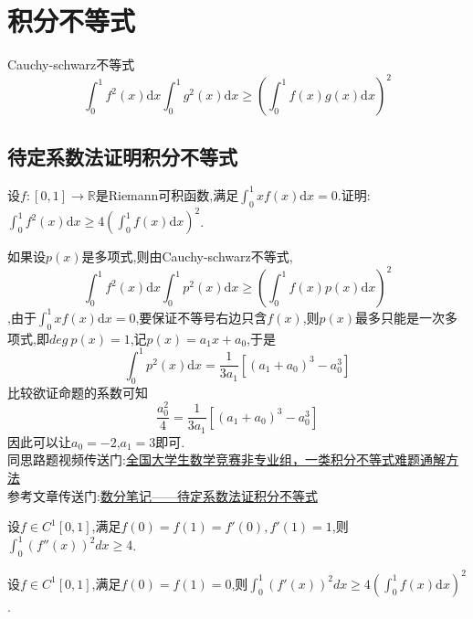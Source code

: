 \chapter{积分不等式}

\begin{theorem}{Cauchy-schwarz不等式}
	$$
		\int_0^1{f^2\left( x \right) \text{d}x}\int_0^1{g^2\left( x \right) \text{d}x}\ge \left( \int_0^1{f\left( x \right) g\left( x \right) \text{d}x} \right) ^2
	$$
\end{theorem}

\section{待定系数法证明积分不等式}

\begin{example}
	设$f:[0,1]\rightarrow \mathbb{R}$是Riemann可积函数,满足$
		\int_0^1{xf\left( x \right) \text{d}x}=0
	$.证明:$
		\int_0^1{f^2\left( x \right) \text{d}x}\ge 4\left( \int_0^1{f\left( x \right) \text{d}x} \right) ^2
	$.
\end{example}

\begin{note}
	如果设$p(x)$是多项式,则由Cauchy-schwarz不等式,
	$$
		\int_0^1{f^2\left( x \right) \text{d}x}\int_0^1{p^2\left( x \right) \text{d}x}\ge \left( \int_0^1{f\left( x \right) p\left( x \right) \text{d}x} \right) ^2
	$$,由于$
		\int_0^1{xf\left( x \right) \text{d}x}=0
	$,要保证不等号右边只含$f(x)$,则$p(x)$最多只能是一次多项式,即$deg\ p\left( x \right) =1$,记$
		p\left( x \right) =a_1x+a_0
	$,于是$$
		\int_0^1{p^2\left( x \right) \text{d}x}=\frac{1}{3a_1}\left[ \left( a_1+a_0 \right) ^3-a_{0}^{3} \right]
	$$比较欲证命题的系数可知$$
		\frac{a_{0}^{2}}{4}=\frac{1}{3a_1}\left[ \left( a_1+a_0 \right) ^3-a_{0}^{3} \right]
	$$因此可以让$a_0=-2$,$a_1=3$即可.\\
	同思路题视频传送门:\href{https://www.bilibili.com/video/BV11Q4y1H7QJ?vd_source=0ca98d2b715e9460da2e574e42c1ab8d}{全国大学生数学竞赛非专业组，一类积分不等式难题通解方法}\\
	参考文章传送门:\href{https://zhuanlan.zhihu.com/p/107553208}{数分笔记——待定系数法证积分不等式}
\end{note}

\begin{example}
	设$f \in C^1[0,1]$,满足$f(0)=f(1)=f'(0),f'(1)=1$,则$
		\int_0^1{\left( f''\left( x \right) \right) ^2dx}\ge 4
	$.
\end{example}

\vspace*{7cm}

\begin{example}
	设$f \in C^1[0,1]$,满足$f(0)=f(1)=0$,则$
		\int_0^1{\left( f'\left( x \right) \right) ^2dx}\ge 4\left( \int_0^1{f\left( x \right) \text{d}x} \right) ^2
	$.
\end{example}
